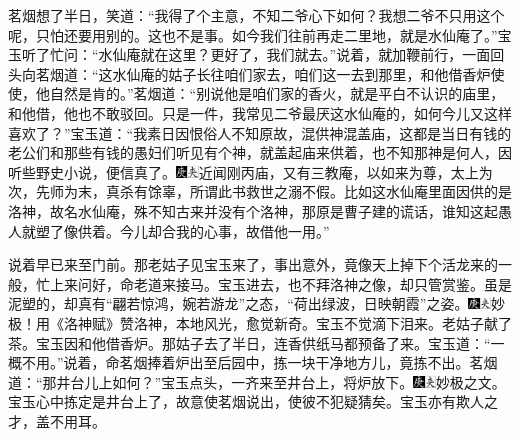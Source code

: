 茗烟想了半日，笑道：“我得了个主意，不知二爷心下如何？我想二爷不只用这个呢，只怕还要用别的。这也不是事。如今我们往前再走二里地，就是水仙庵了。”宝玉听了忙问：“水仙庵就在这里？更好了，我们就去。”说着，就加鞭前行，一面回头向茗烟道：“这水仙庵的姑子长往咱们家去，咱们这一去到那里，和他借香炉使使，他自然是肯的。”茗烟道：“别说他是咱们家的香火，就是平白不认识的庙里，和他借，他也不敢驳回。只是一件，我常见二爷最厌这水仙庵的，如何今儿又这样喜欢了？”宝玉道：“我素日因恨俗人不知原故，混供神混盖庙，这都是当日有钱的老公们和那些有钱的愚妇们听见有个神，就盖起庙来供着，也不知那神是何人，因听些野史小说，便信真了。{\includegraphics[width=3mm]{../Images/00004}\includegraphics[width=3mm]{../Images/00012}\footnotesize \kaishu 近闻刚丙庙，又有三教庵，以如来为尊，太上为次，先师为末，真杀有馀辜，所谓此书救世之溺不假。}比如这水仙庵里面因供的是洛神，故名水仙庵，殊不知古来并没有个洛神，那原是曹子建的谎话，谁知这起愚人就塑了像供着。今儿却合我的心事，故借他一用。”

说着早已来至门前。那老姑子见宝玉来了，事出意外，竟像天上掉下个活龙来的一般，忙上来问好，命老道来接马。宝玉进去，也不拜洛神之像，却只管赏鉴。虽是泥塑的，却真有“翩若惊鸿，婉若游龙”之态，“荷出绿波，日映朝霞”之姿。{\includegraphics[width=3mm]{../Images/00004}\includegraphics[width=3mm]{../Images/00012}\footnotesize \kaishu 妙极！用《洛神赋》赞洛神，本地风光，愈觉新奇。}宝玉不觉滴下泪来。老姑子献了茶。宝玉因和他借香炉。那姑子去了半日，连香供纸马都预备了来。宝玉道：“一概不用。”说着，命茗烟捧着炉出至后园中，拣一块干净地方儿，竟拣不出。茗烟道：“那井台儿上如何？”宝玉点头，一齐来至井台上，将炉放下。{\includegraphics[width=3mm]{../Images/00004}\includegraphics[width=3mm]{../Images/00012}\footnotesize \kaishu 妙极之文。宝玉心中拣定是井台上了，故意使茗烟说出，使彼不犯疑猜矣。宝玉亦有欺人之才，盖不用耳。}

